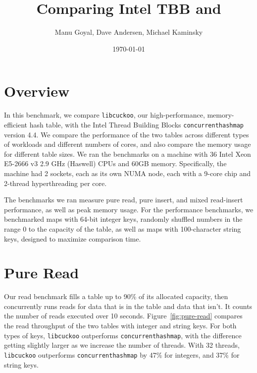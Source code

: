 \documentclass{article}
\title{Comparing Intel TBB {\tbbmap} and \libcuckoo}
\author{Manu Goyal, Dave Andersen, Michael Kaminsky}
\date{\today}
\newcommand{\tbbmap}{\texttt{concurrent\textunderscore hash\textunderscore map}}
\newcommand{\libcuckoo}{\texttt{libcuckoo}}
\begin{document}
\maketitle{}

\section*{Overview}

In this benchmark, we compare {\libcuckoo}, our high-performance,
memory-efficient hash table, with the Intel Thread Building Blocks {\tbbmap}
version 4.4. We compare the performance of the two tables across different types
of workloads and different numbers of cores, and also compare the memory usage
for different table sizes. We ran the benchmarks on a machine with 36 Intel Xeon
E5-2666 v3 2.9 GHz (Haswell) CPUs and 60GB memory. Specifically, the machine had
2 sockets, each as its own NUMA node, each with a 9-core chip and 2-thread
hyperthreading per core.

The benchmarks we ran measure pure read, pure insert, and mixed read-insert
performance, as well as peak memory usage. For the performance benchmarks, we
benchmarked maps with 64-bit integer keys, randomly shuffled numbers in the
range 0 to the capacity of the table, as well as maps with 100-character string
keys, designed to maximize comparison time.

\section*{Pure Read}
Our read benchmark fills a table up to 90\% of its allocated capacity, then
concurrently runs reads for data that is in the table and data that isn't. It
counts the number of reads executed over 10 seconds. Figure~\ref{fig:pure-read}
compares the read throughput of the two tables with integer and string keys. For
both types of keys, {\libcuckoo} outperforms {\tbbmap}, with the difference
getting slightly larger as we increase the number of threads. With 32 threads,
{\libcuckoo} outperforms {\tbbmap} by 47\% for integers, and 37\% for string
keys.
\end{document}
